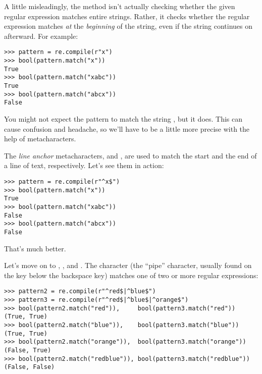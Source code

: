 A little misleadingly, the  method isn't actually checking whether the given regular expression matches entire strings.
Rather, it checks whether the regular expression matches \emph{at} the \emph{beginning} of the string, even if the string continues on afterward.
For example:
\begin{lstlisting}
>>> pattern = re.compile(r"x")
>>> bool(pattern.match("x"))
True
>>> bool(pattern.match("xabc"))
True
>>> bool(pattern.match("abcx"))
False
\end{lstlisting}

You might not expect the pattern  to match the string , but it does.
This can cause confusion and headache, so we'll have to be a little more precise with the help of metacharacters.

The \emph{line anchor} metacharacters,  and , are used to match the start and the end of a line of text, respectively.
Let's see them in action:
\begin{lstlisting}
>>> pattern = re.compile(r"^x$")
>>> bool(pattern.match("x"))
True
>>> bool(pattern.match("xabc"))
False
>>> bool(pattern.match("abcx"))
False
\end{lstlisting}
That's much better.


Let's move on to , , and .
The  character (the ``pipe'' character, usually found on the key below the backspace key) matches one of two or more regular expressions:
\begin{lstlisting}
>>> pattern2 = re.compile(r"^red$|^blue$")
>>> pattern3 = re.compile(r"^red$|^blue$|^orange$")
>>> bool(pattern2.match("red")),     bool(pattern3.match("red"))
(True, True)
>>> bool(pattern2.match("blue")),    bool(pattern3.match("blue"))
(True, True)
>>> bool(pattern2.match("orange")),  bool(pattern3.match("orange"))
(False, True)
>>> bool(pattern2.match("redblue")), bool(pattern3.match("redblue"))
(False, False)
\end{lstlisting}

